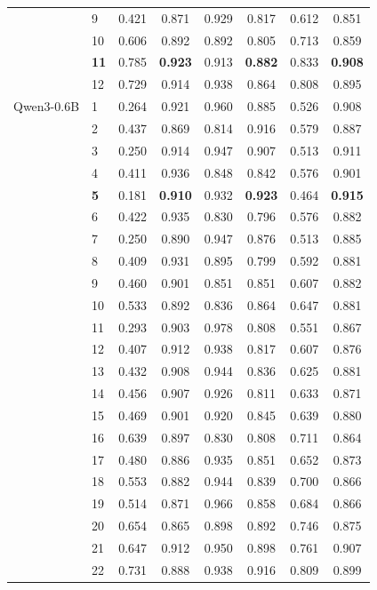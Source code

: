 \begin{longtable}{llcccccc}
 & 9 & 0.421 & 0.871 & 0.929 & 0.817 & 0.612 & 0.851 \\
 & 10 & 0.606 & 0.892 & 0.892 & 0.805 & 0.713 & 0.859 \\
 & \textbf{11} & 0.785 & \textbf{0.923} & 0.913 & \textbf{0.882} & 0.833 & \textbf{0.908} \\
 & 12 & 0.729 & 0.914 & 0.938 & 0.864 & 0.808 & 0.895 \\
\midrule
Qwen3-0.6B & 1 & 0.264 & 0.921 & 0.960 & 0.885 & 0.526 & 0.908 \\
 & 2 & 0.437 & 0.869 & 0.814 & 0.916 & 0.579 & 0.887 \\
 & 3 & 0.250 & 0.914 & 0.947 & 0.907 & 0.513 & 0.911 \\
 & 4 & 0.411 & 0.936 & 0.848 & 0.842 & 0.576 & 0.901 \\
 & \textbf{5} & 0.181 & \textbf{0.910} & 0.932 & \textbf{0.923} & 0.464 & \textbf{0.915} \\
 & 6 & 0.422 & 0.935 & 0.830 & 0.796 & 0.576 & 0.882 \\
 & 7 & 0.250 & 0.890 & 0.947 & 0.876 & 0.513 & 0.885 \\
 & 8 & 0.409 & 0.931 & 0.895 & 0.799 & 0.592 & 0.881 \\
 & 9 & 0.460 & 0.901 & 0.851 & 0.851 & 0.607 & 0.882 \\
 & 10 & 0.533 & 0.892 & 0.836 & 0.864 & 0.647 & 0.881 \\
 & 11 & 0.293 & 0.903 & 0.978 & 0.808 & 0.551 & 0.867 \\
 & 12 & 0.407 & 0.912 & 0.938 & 0.817 & 0.607 & 0.876 \\
 & 13 & 0.432 & 0.908 & 0.944 & 0.836 & 0.625 & 0.881 \\
 & 14 & 0.456 & 0.907 & 0.926 & 0.811 & 0.633 & 0.871 \\
 & 15 & 0.469 & 0.901 & 0.920 & 0.845 & 0.639 & 0.880 \\
 & 16 & 0.639 & 0.897 & 0.830 & 0.808 & 0.711 & 0.864 \\
 & 17 & 0.480 & 0.886 & 0.935 & 0.851 & 0.652 & 0.873 \\
 & 18 & 0.553 & 0.882 & 0.944 & 0.839 & 0.700 & 0.866 \\
 & 19 & 0.514 & 0.871 & 0.966 & 0.858 & 0.684 & 0.866 \\
 & 20 & 0.654 & 0.865 & 0.898 & 0.892 & 0.746 & 0.875 \\
 & 21 & 0.647 & 0.912 & 0.950 & 0.898 & 0.761 & 0.907 \\
 & 22 & 0.731 & 0.888 & 0.938 & 0.916 & 0.809 & 0.899 \\

\end{longtable}
